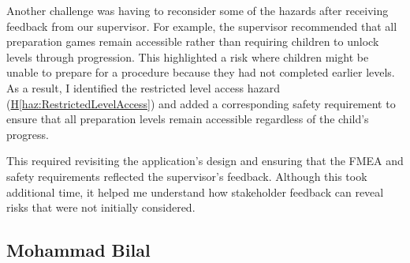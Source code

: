 \documentclass{article}
\newcounter{hazard}
\newcommand{\hazref}[1]{\hyperref[haz:#1]{H\ref*{haz:#1}}}
\begin{document}
\begin{enumerate}
      Another challenge was having to reconsider some of the
      hazards after receiving feedback from our supervisor.
      For example, the supervisor recommended that all
      preparation games remain accessible rather than
      requiring children to unlock levels through progression.
      This highlighted a risk where children might be unable
      to prepare for a procedure because they had not
      completed earlier levels. As a result, I identified
      the restricted level access hazard
      (\hazref{RestrictedLevelAccess}) and added a
      corresponding safety requirement to ensure that
      all preparation levels remain accessible regardless
      of the child's progress.

      This required revisiting the application's design
      and ensuring that the FMEA and safety requirements
      reflected the supervisor's feedback. Although this
      took additional time, it helped me understand how
      stakeholder feedback can reveal risks that were
      not initially considered.
\end{enumerate}

\subsection*{Mohammad Bilal}
\end{document}
